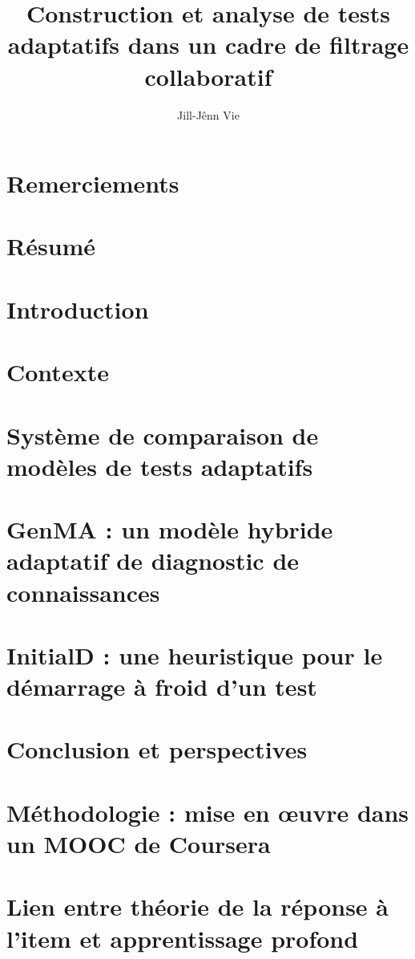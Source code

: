 \documentclass[a4paper,14pt]{memoir}
\title{Construction et analyse de tests adaptatifs dans un cadre de filtrage collaboratif}
\author{Jill-Jênn Vie}
\begin{document}
\maketitle

\chapter*{Remerciements}


\printnomenclature

\chapter*{Résumé}


\clearpage
\tableofcontents*

\chapter{Introduction}


\chapter{Contexte}


\chapter{Système de comparaison de modèles de tests adaptatifs}



\chapter{GenMA : un modèle hybride adaptatif de diagnostic de connaissances}




\chapter{InitialD : une heuristique pour le démarrage à froid d'un test}




\chapter{Conclusion et perspectives}


\appendix

\chapter{Méthodologie : mise en œuvre dans un MOOC de Coursera}



\chapter{Lien entre théorie de la réponse à l'item et apprentissage profond}


\nocite{*}
\printbibliography
\end{document}

